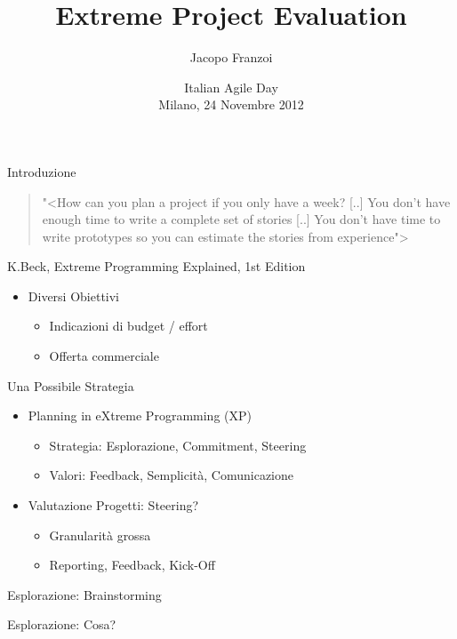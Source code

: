 \documentclass[compress, red, 14pt]{beamer}
\title{ Extreme Project Evaluation }
\author{
	Jacopo Franzoi
}
\institute{
	jacopo.franzoi@gmail.com
}
\date{
	Italian Agile Day \\
	Milano, 24 Novembre 2012
}
\begin{document}
	\begin{frame}
		\titlepage
	\end{frame}

	\begin{frame}{Introduzione}
		\begin{quote}
			{\small "<{How can you plan a project if you only have a week? [..] You don't have enough time to write a complete set of stories [..] You don't have time to write prototypes so you can estimate the stories from experience}">}
		\end{quote}
		\hfill {\scriptsize K.Beck, Extreme Programming Explained, 1st Edition}

		\begin{itemize}
			\item Diversi Obiettivi
			\begin{itemize}
				\item Indicazioni di budget / effort
				\item Offerta commerciale
			\end{itemize}
		\end{itemize}
	\end{frame}


	\begin{frame}{Una Possibile Strategia}
		\begin{itemize}
			\item Planning in eXtreme Programming (XP)
			\begin{itemize}
				\item Strategia: Esplorazione, Commitment, Steering
				\item Valori: Feedback, Semplicità, Comunicazione
			\end{itemize}

			\item Valutazione Progetti: Steering?
			\begin{itemize}
				\item Granularità grossa
				\item Reporting, Feedback, Kick-Off
			\end{itemize}

		\end{itemize}
	\end{frame}


	\begin{frame}{Esplorazione: Brainstorming}
	\end{frame}

	\begin{frame}{Esplorazione: Cosa?}
	\end{frame}
\end{document}
